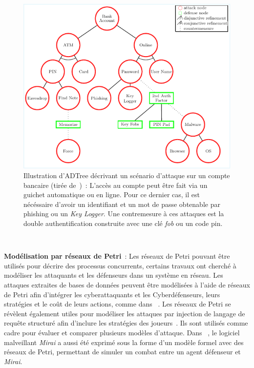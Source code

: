 \begin{figure}[h!]
  \centering
  \includegraphics[width=\linewidth]{figures/adt.pdf}
  \caption[Illustration d'ADTree d'un scénario d'attaque sur un compte bancaire (tirée de~\cite{BKordy2010})]{Illustration d'ADTree décrivant un scénario d'attaque sur un compte bancaire (tirée de~\cite{BKordy2010})~: L'accès au compte peut être fait via un guichet automatique ou en ligne. Pour ce dernier cas, il est nécéssaire d'avoir un identifiant et un mot de passe obtenable par phishing ou un \textit{Key Logger}. Une contremesure à ces attaques est la double authentification construite avec une clé \textit{fob} ou un code pin.}
  \label{fig:bank_attack_defense_tree}
\end{figure}

\

\noindent
\textbf{Modélisation par réseaux de Petri}~: \quad Les réseaux de Petri pouvant être utilisés pour décrire des processus concurrents, certains travaux ont cherché à modéliser les attaquants et les défenseurs dans un système en réseau.
Les attaques extraites de bases de données peuvent être modélisées à l'aide de réseaux de Petri afin d'intégrer les cyberattaquants et les Cyberdéfenseurs, leurs stratégies et le coût de leurs actions, comme dans ~\cite{MPetty2022}. Les réseaux de Petri se révèlent également utiles pour modéliser les attaques par injection de langage de requête structuré afin d'inclure les stratégies des joueurs~\cite{JBland2020}.
Ils sont utilisés comme cadre pour évaluer et comparer plusieurs modèles d'attaque.
Dans ~\cite{SYamaguchi2020}, le logiciel malveillant \textit{Mirai} a aussi été exprimé sous la forme d'un modèle formel avec des réseaux de Petri, permettant de simuler un combat entre un agent défenseur et \textit{Mirai}.

